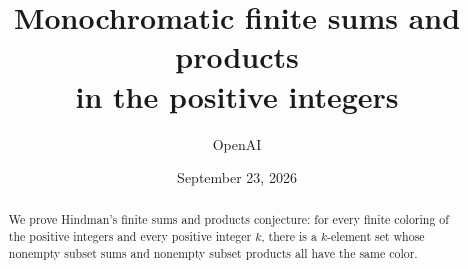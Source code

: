\documentclass[11pt]{article}
\title{Monochromatic finite sums and products\\in the positive integers}
\author{OpenAI}
\date{September 23, 2026}
\numberwithin{equation}{section}
\theoremstyle{definition}
\theoremstyle{remark}
\newcommand{\1}{\mathbf 1}
\begin{document}
\maketitle
\begin{abstract}
We prove Hindman's finite sums and products conjecture: for every finite
coloring of the positive integers and every positive integer $k$, there is a
$k$-element set whose nonempty subset sums and nonempty subset products all
have the same color.
\end{abstract}
\tableofcontents









\end{document}
